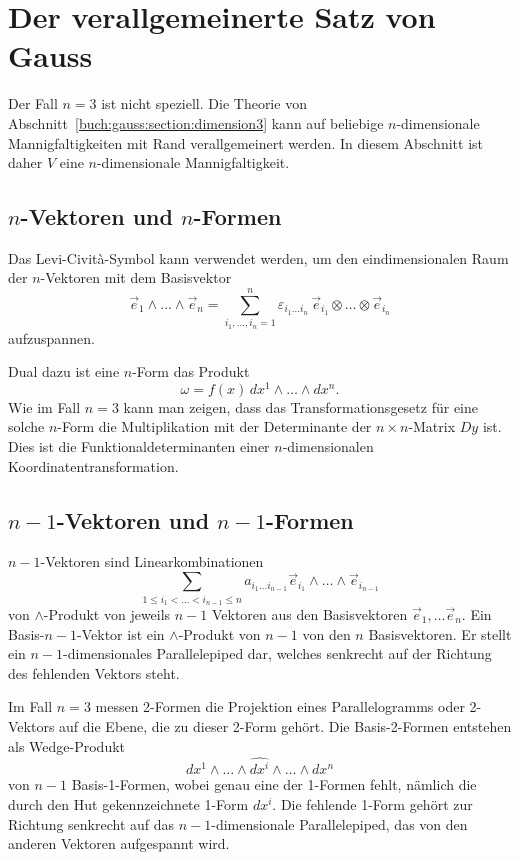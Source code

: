 %
%
\section{Der verallgemeinerte Satz von Gauss
\label{buch:gauss:section:satzvongauss}}
Der Fall $n=3$ ist nicht speziell.
Die Theorie von Abschnitt~\ref{buch:gauss:section:dimension3}
kann auf beliebige $n$-dimensionale Mannigfaltigkeiten mit Rand
verallgemeinert werden.
In diesem Abschnitt ist daher $V$ eine $n$-dimensionale Mannigfaltigkeit.

% 
%
\subsection{$n$-Vektoren und $n$-Formen}
Das Levi-Cività-Symbol kann verwendet werden, um den eindimensionalen
Raum der $n$-Vektoren mit dem Basisvektor
\[
\vec{e}_1\wedge\dots\wedge \vec{e}_n
=
\sum_{i_1,\dots,i_n=1}^n
\varepsilon_{i_1\dots i_n}
\,
\vec{e}_{i_1}\otimes\dots\otimes\vec{e}_{i_n}
\]
aufzuspannen.

Dual dazu ist eine $n$-Form das Produkt
\[
\omega
=
f(x)
\,
dx^1\wedge\dots\wedge dx^n.
\]
Wie im Fall $n=3$ kann man zeigen, dass das Transformationsgesetz
für eine solche $n$-Form die Multiplikation mit der Determinante
der $n\times n$-Matrix $Dy$ ist.
Dies ist die Funktionaldeterminanten einer $n$-dimensionalen
Koordinatentransformation.

%
%
\subsection{$n-1$-Vektoren und $n-1$-Formen}
$n-1$-Vektoren sind Linearkombinationen
\[
\sum_{1\le i_1<\dots<i_{n-1}\le n}
a_{i_1\dots i_{n-1}}
\vec{e}_{i_1}\wedge\dots\wedge \vec{e}_{i_{n-1}}
\]
von $\wedge$-Produkt von jeweils $n-1$ Vektoren aus den Basisvektoren
$\vec{e}_1,\dots\vec{e}_n$.
Ein Basis-$n-1$-Vektor ist ein $\wedge$-Produkt von $n-1$ von den $n$
Basisvektoren.
Er stellt ein $n-1$-dimensionales Parallelepiped dar, welches senkrecht
auf der Richtung des fehlenden Vektors steht.

Im Fall $n=3$ messen 2-Formen die Projektion eines Parallelogramms
oder 2-Vektors auf die Ebene, die zu dieser 2-Form gehört.
Die Basis-2-Formen entstehen als Wedge-Produkt
\[
dx^1\wedge\dots\wedge \widehat{dx^i}\wedge\dots\wedge dx^n
\]
von $n-1$ Basis-1-Formen, wobei genau eine der 1-Formen fehlt,
nämlich die durch den Hut gekennzeichnete 1-Form $dx^i$.
Die fehlende 1-Form gehört zur Richtung senkrecht auf das
$n-1$-dimensionale Parallelepiped, das von den anderen Vektoren
aufgespannt wird.

